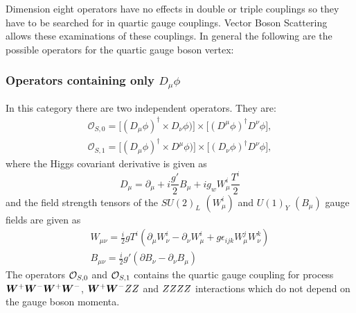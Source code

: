 Dimension eight operators have no effects in double or triple couplings so they have to be searched for in quartic gauge couplings. Vector Boson Scattering allows these examinations of these couplings. In general the following are the possible operators for the quartic gauge boson vertex:

\subsubsection{Operators containing only $D_\mu \phi$} %
\label{ssub:operators_containing_only_}
In this category there are two independent operators. They are:
\begin{eqnarray}
    \mathcal{O}_{S,0}=\Big[(D_{\mu}\phi)^{\dagger}\times D_{\nu}\phi) \Big]\times \Big[(D^{\mu}\phi)^{\dagger}D^{\nu}\phi \Big], \\
    \mathcal{O}_{S,1}=\Big[(D_{\mu}\phi)^{\dagger}\times D^{\mu}\phi)\Big]\times \Big[(D_{\nu}\phi)^{\dagger} D^{\nu}\phi\Big],
\end{eqnarray}
where the Higgs covariant derivative is given as
\begin{equation}\label{eq:covarient_derivative_qgc}
     D_\mu = \partial_\mu + i\frac{g'}{2}B_\mu + ig_w W^i_{\mu} \frac{T^i}{2}
 \end{equation} 
 and the field strength tensors of the $SU(2)_L$ $(W^i_\mu)$ and $U(1)_Y$  $(B_\mu)$ gauge fields are given as
\begin{eqnarray}\label{eq:fieldstrength_qgc}
    W_{\mu \nu} = \frac{i}{2}g T^i (\partial_\mu W^i_\nu - \partial_\nu W^i_\mu + g \epsilon_{ijk} W^j_\mu W^k_\nu) \\
    B_{\mu \nu} = \frac{i}{2} g' (\partial B_\nu - \partial_\nu B_\mu)
\end{eqnarray}
The operators $\mathcal{O}_{S,0}$ and $\mathcal{O}_{S,1}$ contains the quartic gauge coupling for process $\boldsymbol{W}^+\boldsymbol{W}^- \boldsymbol{W}^+\boldsymbol{W}^-$, $\boldsymbol{W}^+\boldsymbol{W}^- ZZ$ and $ZZ ZZ$ interactions which do not depend on the gauge boson momenta. 

